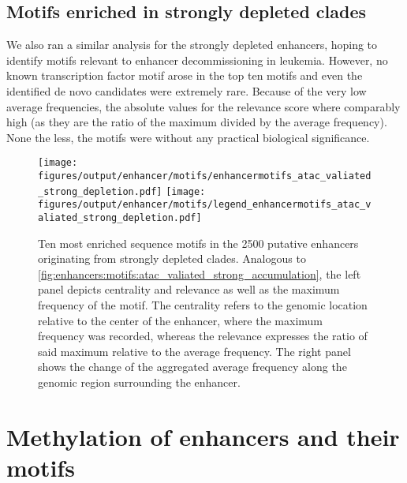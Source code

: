 \subsection{Motifs enriched in strongly depleted clades}
\label{chap:r:enhancers:motifs:tfs:depl}

We also ran a similar analysis for the strongly depleted enhancers, hoping to identify motifs relevant to enhancer decommissioning in \mllafnine leukemia. However, no known transcription factor motif arose in the top ten motifs and even the identified de novo candidates were extremely rare. Because of  the very low average frequencies, the absolute values for the relevance score where comparably high (as they are the ratio of the maximum divided by the average frequency). None the less, the motifs were without any practical biological significance.

\begin{figure}[!htb]
	\centering
	\texttt{[image: figures/output/enhancer/motifs/enhancermotifs\_atac\_valiated\_strong\_depletion.pdf]} 
	\texttt{[image: figures/output/enhancer/motifs/legend\_enhancermotifs\_atac\_valiated\_strong\_depletion.pdf]} 
	\caption{Ten most enriched sequence motifs in the \num{2500} putative enhancers originating from strongly depleted clades. Analogous to \autoref{fig:enhancers:motifs:atac_valiated_strong_accumulation}, the left panel depicts centrality and relevance as well as the maximum frequency of the motif. The centrality refers to the genomic location relative to the center of the enhancer, where the maximum frequency was recorded, whereas the relevance expresses the ratio of said maximum relative to the average frequency. The right panel shows the change of the aggregated average frequency along the genomic region surrounding the enhancer.} 
	\label{fig:enhancers:motifs.atac_valiated_strong_depletion}
\end{figure}


\section{Methylation of enhancers and their motifs}
\label{chap:r:enhancers:motifs:methylation}

